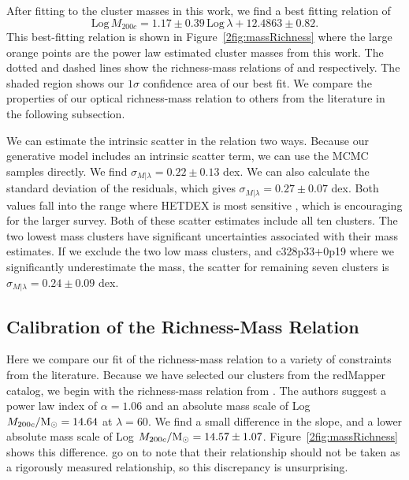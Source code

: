 After fitting to the cluster masses in this work, we find a best fitting relation of
\begin{equation}\label{2eq: best fit}
 \mathrm{Log}\,M_{200c}=1.17\pm{0.39}\, \mathrm{Log}\,\lambda + 12.4863\pm{0.82}. 
\end{equation}
This best-fitting relation is shown in Figure~\ref{2fig:massRichness} where the large orange points are the power law estimated cluster masses from this work. The dotted and dashed lines show the richness-mass relations of \cite{Rykoff2012} and \cite{Farahi2016} respectively. The shaded region shows our $1\sigma$ confidence area of our best fit. We compare the properties of our optical richness-mass relation to others from the literature in the following subsection.

We can estimate the intrinsic scatter in the relation two ways. Because our generative model includes an intrinsic scatter term, we can use the MCMC samples directly. We find $\sigma_{M|\lambda} = 0.22\pm0.13$ dex. We can also calculate the standard deviation of the residuals, which gives  $\sigma_{M|\lambda} = 0.27\pm0.07$ dex. Both values fall into the range where HETDEX is most sensitive , which is encouraging for the larger survey. Both of these scatter estimates include all ten clusters. The two lowest mass clusters have significant uncertainties associated with their mass estimates. If we exclude the two low mass clusters, and c328p33+0p19 where we significantly underestimate the mass, the scatter for remaining seven clusters is $\sigma_{M|\lambda} = 0.24\pm0.09$ dex.

\subsection{Calibration of the Richness-Mass Relation}
Here we compare our fit of the richness-mass relation to a variety of constraints from the literature. Because we have selected our clusters from the redMapper catalog, we begin with the richness-mass relation from \cite{Rykoff2012}. The authors suggest a power law index of $\alpha=1.06$ and an absolute mass scale of Log $M_{200c}/\hbox{$\mathrm{M}_\odot$}=14.64$ at $\lambda=60$. We find a small difference in the slope, and a lower absolute mass scale of Log $M_{200c}/\hbox{$\mathrm{M}_\odot$} = 14.57\pm1.07$. Figure~\ref{2fig:massRichness} shows this difference. \cite{Rykoff2012} go on to note that their relationship should not be taken as a rigorously measured relationship, so this discrepancy is unsurprising. 

